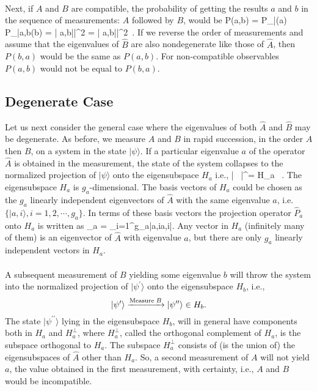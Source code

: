 \paragraph{}
Next, if $A$ and $B$ are compatible, the probability of getting the results $a$ and $b$ in the sequence
of measurements: $A$ followed by $B$,  would be
\be 
P(a,b) = P_{|\psi\rangle}(a) P_{|a,b\rangle}(b) = \left| \langle a,b|\psi\rangle \right|^2  = \left| \langle a,b|\psi\rangle \right|^2\, .
\ee
If we reverse the order of measurements and assume that the eigenvalues of $\hat{B}$ are also nondegenerate like those of 
$\hat{A}$, then $P(b,a)$ would be the same as $P(a,b)$. For non-compatible observables $P(a,b)$ would not be equal to $P(b,a)$.






\subsection{Degenerate Case}
Let us next consider the general case where the eigenvalues of both $\hat{A}$ and $\hat{B}$ may be degenerate. As before, we measure $A$ and $B$ in rapid succession, in the order
$A$ then $B$, on a system in the state $|\psi\rangle$. If a particular eigenvalue $a$ of the operator $\hat{A}$ is
obtained in the measurement, the state of the system collapses to the normalized projection of $|\psi\rangle$ onto the eigensubspace $H_a$ i.e.,
\be
|\psi\rangle {} \, |\psi^{\prime}\rangle = 
{} \in H_a \, .
\ee
The eigensubspace $H_a$ is $g_a$-dimensional. The basis vectors of $H_a$ could be chosen as the $g_a$ linearly independent eigenvectors 
of $\hat{A}$  with the same eigenvalue $a$, i.e. $\{|a,i\rangle, i = 1,2, \cdots , g_a\}$.  In terms of these basis vectors the projection operator $\hat{P}_a$ onto $H_a$ is written as
\be
{}_a = \sum_{i=1}^{g_a}|a,i\rangle \langle a,i|.
\ee
Any vector in $H_a$  (infinitely many of them) is an eigenvector of $\hat{A}$ with eigenvalue $a$, but there are only $g_a$ linearly independent vectors 
in $H_a$. 


\paragraph{}
A subsequent measurement of $B$ yielding some
 eigenvalue $b$ will throw the system into the normalized projection of $|\psi^{\prime}\rangle$  onto the eigensubspace $H_b$, i.e.,
\[ |\psi^{\prime}\rangle \xrightarrow{{\rm Measure}\; B} |\psi^{\prime \prime}\rangle \in H_b.\]
The state $|\psi^{\prime \prime}\rangle$ lying in the 
eigensubspace $H_b$,  will in general have components both in $H_a$ and $H_a^{ \bot}$, where $H_a^{ \bot}$, called the orthogonal complement 
of $H_a$, is the subspace orthogonal to $H_a$. The subspace $H_a^{ \bot}$ consists of (is the union of) the eigensubspaces 
of $\hat{A}$ other than $H_a$. So, a second measurement of $A$ will not yield $a$, the value obtained in the first measurement, with certainty, i.e., $A$ and $B$ would be incompatible.


